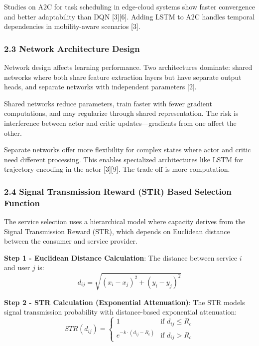 Studies on A2C for task scheduling in edge-cloud systems show faster
convergence and better adaptability than DQN {[}3{]}{[}6{]}. Adding LSTM
to A2C handles temporal dependencies in mobility-aware scenarios
{[}3{]}.

\hypertarget{network-architecture-design}{%
	\subsubsection{2.3 Network Architecture
		Design}\label{network-architecture-design}}

Network design affects learning performance. Two architectures dominate:
shared networks where both share feature extraction layers but have
separate output heads, and separate networks with independent parameters
{[}2{]}.

Shared networks reduce parameters, train faster with fewer gradient
computations, and may regularize through shared representation. The risk
is interference between actor and critic updates---gradients from one
affect the other.

Separate networks offer more flexibility for complex states where actor
and critic need different processing. This enables specialized
architectures like LSTM for trajectory encoding in the actor
{[}3{]}{[}9{]}. The trade-off is more computation.

\hypertarget{signal-transmission-reward-str-based-selection-function}{%
	\subsubsection{2.4 Signal Transmission Reward (STR) Based Selection
		Function}\label{signal-transmission-reward-str-based-selection-function}}

The service selection uses a hierarchical model where capacity derives
from the Signal Transmission Reward (STR), which depends on Euclidean
distance between the consumer and service provider.

\textbf{Step 1 - Euclidean Distance Calculation}: The distance between
service \(i\) and user \(j\) is:
\[d_{ij} = \sqrt{(x_i - x_j)^2 + (y_i - y_j)^2}\]

\textbf{Step 2 - STR Calculation (Exponential Attenuation)}: The STR
models signal transmission probability with distance-based exponential
attenuation:
\[STR(d_{ij}) = \begin{cases} 1 & \text{if } d_{ij} \leq R_c \\ e^{-k \cdot (d_{ij} - R_c)} & \text{if } d_{ij} > R_c \end{cases}\]

